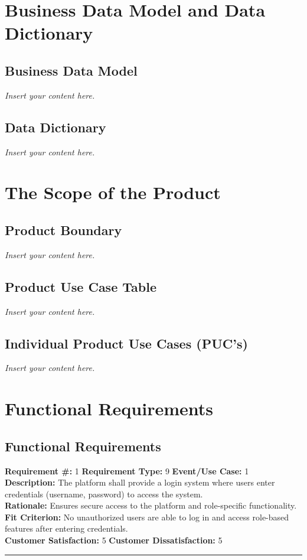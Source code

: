 \documentclass[12pt]{article}
\newcommand{\lips}{\textit{Insert your content here.}}
\begin{document}
\section{Business Data Model and Data Dictionary}
\subsection{Business Data Model}
\lips
\subsection{Data Dictionary}
\lips

\section{The Scope of the Product}
\subsection{Product Boundary}
\lips
\subsection{Product Use Case Table}
\lips
\subsection{Individual Product Use Cases (PUC's)}
\lips

\section{Functional Requirements}
\subsection{Functional Requirements}
\textbf{Requirement \#:} 1 \quad \textbf{Requirement Type:} 9 \quad \textbf{Event/Use Case:} 1 \\
\textbf{Description:} The platform shall provide a login system where users enter credentials (username, password) to access the system.\\
\textbf{Rationale:} Ensures secure access to the platform and role-specific functionality.\\
\textbf{Fit Criterion:} No unauthorized users are able to log in and access role-based features after entering credentials.\\
\textbf{Customer Satisfaction:} 5 \quad\quad \textbf{Customer Dissatisfaction:} 5 \\
\noindent\rule{\textwidth}{1pt}
\end{document}
